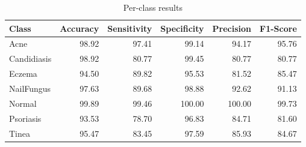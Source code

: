 \begin{table}
\caption{Per-class results}
\label{tab:results}
\begin{tabular}{lrrrrr}
\toprule
Class & Accuracy & Sensitivity & Specificity & Precision & F1-Score \\
\midrule
Acne & 98.92 & 97.41 & 99.14 & 94.17 & 95.76 \\
Candidiasis & 98.92 & 80.77 & 99.45 & 80.77 & 80.77 \\
Eczema & 94.50 & 89.82 & 95.53 & 81.52 & 85.47 \\
NailFungus & 97.63 & 89.68 & 98.88 & 92.62 & 91.13 \\
Normal & 99.89 & 99.46 & 100.00 & 100.00 & 99.73 \\
Psoriasis & 93.53 & 78.70 & 96.83 & 84.71 & 81.60 \\
Tinea & 95.47 & 83.45 & 97.59 & 85.93 & 84.67 \\
\bottomrule
\end{tabular}
\end{table}
